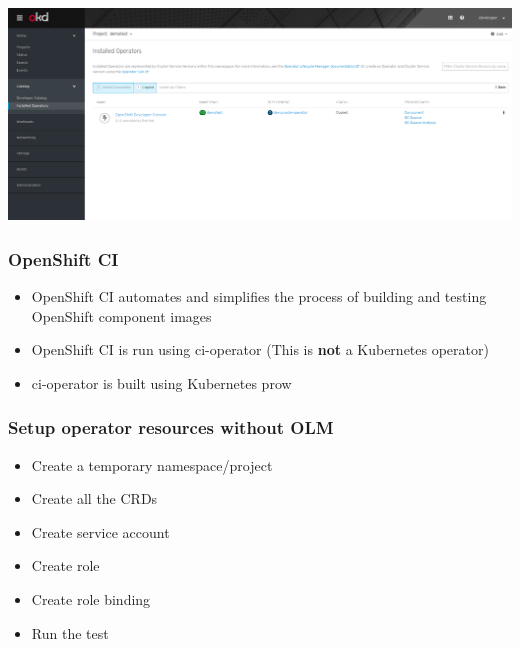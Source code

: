 \documentclass[aspectratio=169]{beamer}
\begin{document}
\begin{frame}

  \includegraphics[scale=.20]{images/subscription.png}

\end{frame}

\begin{frame}

  \frametitle{OpenShift CI}

  \begin{itemize}
  \item OpenShift CI automates and simplifies the process of building and testing OpenShift component images
  \item OpenShift CI is run using ci-operator (This is {\bf not} a Kubernetes operator)
  \item ci-operator is built using Kubernetes prow
  \end{itemize}

\end{frame}

\begin{frame}[fragile]
  \frametitle{Setup operator resources without OLM}
  \begin{itemize}
  \item Create a temporary namespace/project
  \item Create all the CRDs
  \item Create service account
  \item Create role
  \item Create role binding
  \item Run the test
  \end{itemize}
\end{frame}
\end{document}
